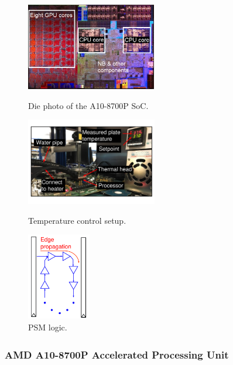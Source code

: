 \begin{figure}[t!]
  \centering
  \begin{minipage}{0.37\linewidth}
    \centering
                \includegraphics[trim=0 0 0 0,clip,height=1.5in]{graphs/carrizo-die.jpg}
                \caption{Die photo of the A10-8700P SoC.}
                \label{fig:die-shot}
  \end{minipage}
\hfill
  \begin{minipage}{0.37\linewidth}
    \centering
                \includegraphics[trim=0 55 0 55,clip,height=1.5in]{graphs/temperature-control.pdf}
                \caption{Temperature control setup.}
                \label{fig:temp-control-photo}
  \end{minipage}
\hfill
  \begin{minipage}{0.20\linewidth}
    \centering
                \includegraphics[trim=40 0 40 0,clip,height=1.5in]{graphs/psm-struct.pdf}
                \caption{PSM logic.}
                \label{fig:psm-struct}
  \end{minipage}
  \vspace*{-0.08in}
\end{figure}

\subsubsection{AMD\textsuperscript{\textregistered} A10-8700P Accelerated Processing Unit}
\label{sec:tistate:setup:apu}

